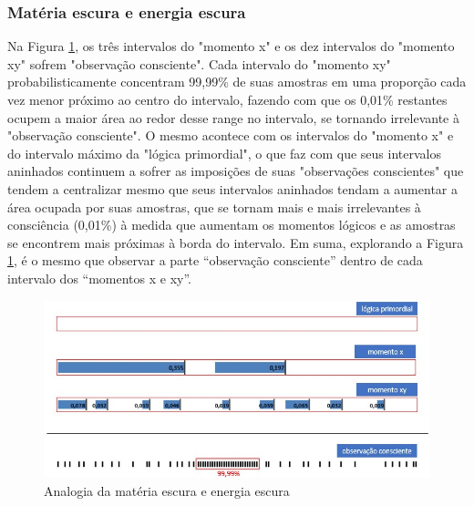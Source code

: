 \subsubsection{Matéria escura e energia escura}
Na Figura \ref{fig:consciousness_dark_matter_dark_energy}, os três intervalos do "momento x" e os dez intervalos do "momento xy" sofrem "observação consciente". Cada intervalo do "momento xy" probabilisticamente concentram 99,99\% de suas amostras em uma proporção cada vez menor próximo ao centro do intervalo, fazendo com que os 0,01\% restantes ocupem a maior área ao redor desse range no intervalo, se tornando irrelevante à "observação consciente". O mesmo acontece com os intervalos do "momento x" e do intervalo máximo da "lógica primordial", o que faz com que seus intervalos aninhados continuem a sofrer as imposições de suas "observações conscientes" que tendem a centralizar mesmo que seus intervalos aninhados tendam a aumentar a área ocupada por suas amostras, que se tornam mais e mais irrelevantes à consciência (0,01\%) à medida que aumentam os momentos lógicos e as amostras se encontrem mais próximas à borda do intervalo. Em suma, explorando a Figura \ref{fig:consciousness_dark_matter_dark_energy}, é o mesmo que observar a parte “observação consciente” dentro de cada intervalo dos “momentos x e xy”. 

\begin{figure}[H]
\caption{Analogia da matéria escura e energia escura}
\label{fig:consciousness_dark_matter_dark_energy}
\centering
\includegraphics[scale=.8]{sections/images/consciousness_dark_matter_dark_energy.jpg}
\end{figure}


